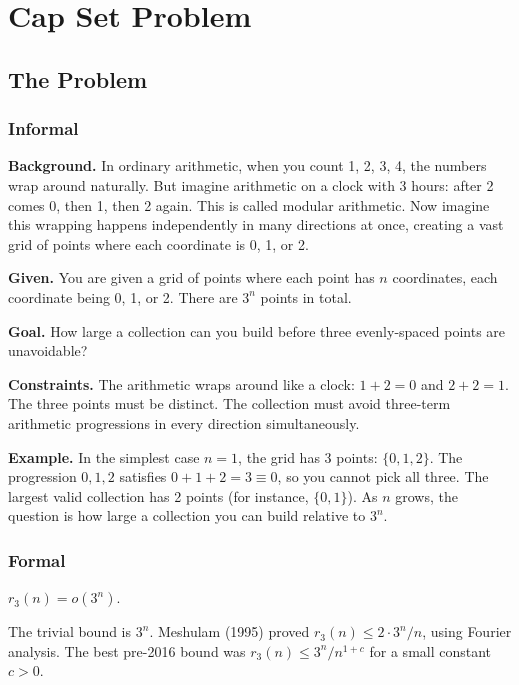 \let\LocalMacro\relax

\chapter{Cap Set Problem}

\section{The Problem}

\subsection{Informal}

\textbf{Background.} In ordinary arithmetic, when you count 1, 2, 3, 4, the numbers wrap around naturally. But imagine arithmetic on a clock with 3 hours: after 2 comes 0, then 1, then 2 again. This is called modular arithmetic. Now imagine this wrapping happens independently in many directions at once, creating a vast grid of points where each coordinate is 0, 1, or 2.

\textbf{Given.} You are given a grid of points where each point has $n$ coordinates, each coordinate being 0, 1, or 2. There are $3^n$ points in total.

\textbf{Goal.} How large a collection can you build before three evenly-spaced points are unavoidable?

\textbf{Constraints.} The arithmetic wraps around like a clock: $1 + 2 = 0$ and $2 + 2 = 1$. The three points must be distinct. The collection must avoid three-term arithmetic progressions in every direction simultaneously.

\textbf{Example.} In the simplest case $n = 1$, the grid has 3 points: $\{0, 1, 2\}$. The progression $0, 1, 2$ satisfies $0 + 1 + 2 = 3 \equiv 0$, so you cannot pick all three. The largest valid collection has 2 points (for instance, $\{0, 1\}$). As $n$ grows, the question is how large a collection you can build relative to $3^n$.

\subsection{Formal}
\begin{conjecture}
$r_3(n) = o(3^n)$.
\end{conjecture}

The trivial bound is $3^n$. Meshulam (1995) proved $r_3(n) \le 2 \cdot 3^n / n$, using Fourier analysis. The best pre-2016 bound was $r_3(n) \le 3^n / n^{1+c}$ for a small constant $c > 0$.

